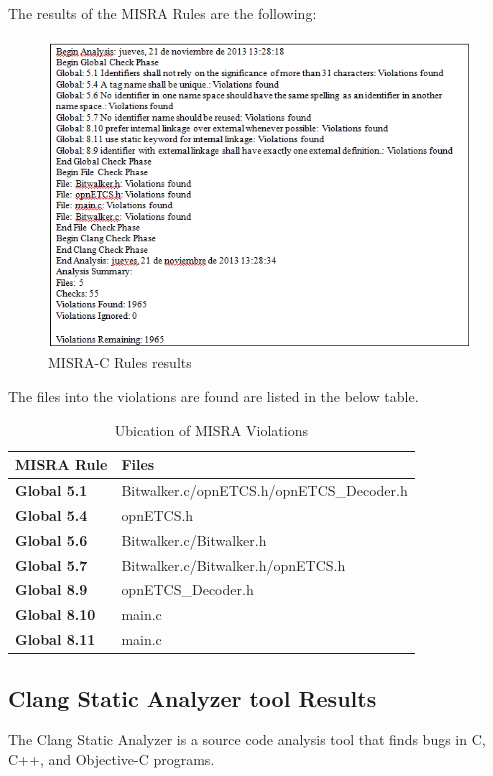 The results of the MISRA Rules are the following:
\begin{figure}[H]
\centering
\includegraphics{./figures/understand.png}
\caption{MISRA-C Rules results}
\end{figure}

The files into the violations are found are listed in the below table.

{\footnotesize\sffamily\centering
  \begin{longtable}{||p{}|p{}||}
  \caption{Ubication of MISRA Violations}\\
    \hline\hline
    \textbf{MISRA Rule} & \textbf{Files} \\
    \hline\hline
    \endhead
    \hline\hline
    \endfoot
    \textbf{Global 5.1}
& Bitwalker.c/opnETCS.h/opnETCS\_Decoder.h
    \\
    \hline
    \textbf{Global 5.4}
& opnETCS.h
    \\
    \hline
    \textbf{Global 5.6}
& Bitwalker.c/Bitwalker.h
    \\
    \hline
    \textbf{Global 5.7}
& Bitwalker.c/Bitwalker.h/opnETCS.h
    \\
    \hline
    \textbf{Global 8.9}
& opnETCS\_Decoder.h
    \\
    \hline
    \textbf{Global 8.10}
& main.c
    \\
    \hline
    \textbf{Global 8.11}
& main.c
    \\
    \hline
\end{longtable}}

\subsection{Clang Static Analyzer tool Results}
The Clang Static Analyzer is a source code analysis tool that finds bugs in C, C++, and Objective-C programs.


